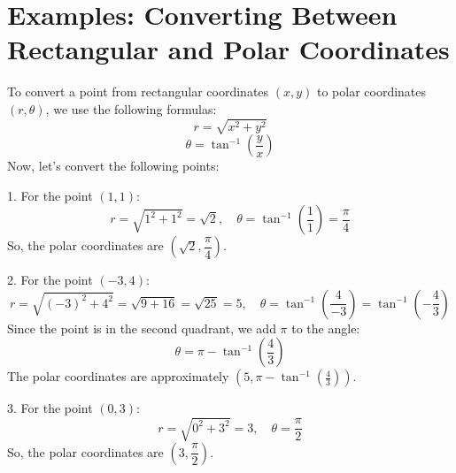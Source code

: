 \documentclass{article}
\begin{document}
\section*{Examples: Converting Between Rectangular and Polar Coordinates}

\begin{examplebox}
    To convert a point from rectangular coordinates $(x, y)$ to polar coordinates $(r, \theta)$, we use the following formulas:
    \[
    r = \sqrt{x^2 + y^2}
    \]
    \[
    \theta = \tan^{-1} \left( \frac{y}{x} \right)
    \]
    Now, let's convert the following points:
    \begin{exercisebox}
        1. For the point $(1, 1)$:
        \[
        r = \sqrt{1^2 + 1^2} = \sqrt{2}, \quad \theta = \tan^{-1} \left( \frac{1}{1} \right) = \frac{\pi}{4}
        \]
        So, the polar coordinates are $\left( \sqrt{2}, \dfrac{\pi}{4} \right)$.
    \end{exercisebox}
    
    \begin{exercisebox}
        2. For the point $(-3, 4)$:
        \[
        r = \sqrt{(-3)^2 + 4^2} = \sqrt{9 + 16} = \sqrt{25} = 5, \quad \theta = \tan^{-1} \left( \frac{4}{-3} \right) = \tan^{-1} \left( -\frac{4}{3} \right)
        \]
        Since the point is in the second quadrant, we add $\pi$ to the angle:
        \[
        \theta = \pi - \tan^{-1} \left( \frac{4}{3} \right)
        \]
        The polar coordinates are approximately $\left( 5, \pi - \tan^{-1} \left( \frac{4}{3} \right) \right)$.
    \end{exercisebox}
    
    \begin{exercisebox}
        3. For the point $(0, 3)$:
       \[
       r = \sqrt{0^2 + 3^2} = 3, \quad \theta = \frac{\pi}{2}
       \]
       So, the polar coordinates are $(3, \dfrac{\pi}{2})$.
    \end{exercisebox}
    \end{examplebox}
    
\end{document}
